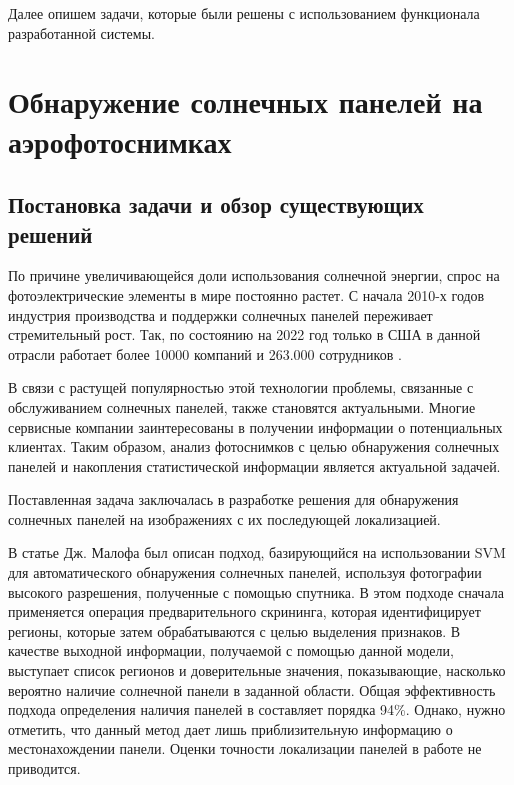 Далее опишем задачи, которые были решены с использованием функционала разработанной системы.

\section{Обнаружение солнечных панелей на аэрофотоснимках}

\subsection{Постановка задачи и обзор существующих решений}
По причине увеличивающейся доли использования солнечной энергии, спрос на фотоэлектрические элементы в мире постоянно растет. С начала 2010-х годов индустрия производства и поддержки солнечных панелей переживает стремительный рост. Так, по состоянию на 2022 год только в США в данной отрасли работает более 10000 компаний и 263.000 сотрудников \cite{seia}.

В связи с растущей популярностью этой технологии проблемы, связанные с обслуживанием солнечных панелей, также становятся актуальными. Многие сервисные компании заинтересованы в получении информации о потенциальных клиентах. Таким образом, анализ фотоснимков с целью обнаружения солнечных панелей и накопления статистической информации является актуальной задачей.


Поставленная задача заключалась в разработке решения для обнаружения солнечных панелей на изображениях с их последующей локализацией.

В статье Дж. Малофа \cite{malof2015} был описан подход, базирующийся на использовании SVM для автоматического обнаружения солнечных панелей, используя фотографии высокого разрешения, полученные с помощью спутника. В этом подходе сначала применяется операция предварительного скрининга, которая идентифицирует регионы, которые затем обрабатываются с целью выделения признаков. В качестве выходной информации, получаемой с помощью данной модели, выступает список регионов и доверительные значения, показывающие, насколько вероятно наличие солнечной панели в заданной области. Общая эффективность подхода определения наличия панелей в \cite{malof2015} составляет порядка 94\%. Однако, нужно отметить, что данный метод дает лишь приблизительную информацию о местонахождении панели. Оценки точности локализации панелей в работе не приводится.

